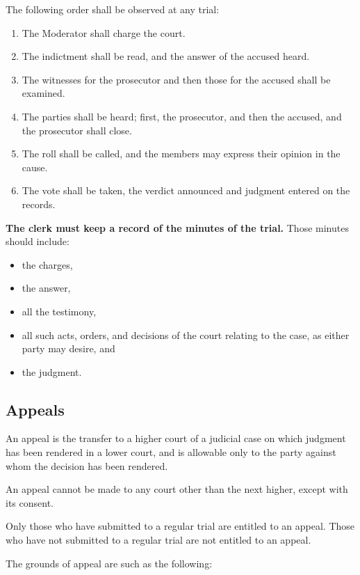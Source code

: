 \documentclass[
]{book}
\providecommand{\tightlist}{%
  \setlength{\itemsep}{0pt}\setlength{\parskip}{0pt}}
\begin{document}
The following order shall be observed at any trial:

\begin{enumerate}
\def\labelenumi{\arabic{enumi}.}
\tightlist
\item
  The Moderator shall charge the court.
\item
  The indictment shall be read, and the answer of the accused heard.
\item
  The witnesses for the prosecutor and then those for the accused shall be examined.
\item
  The parties shall be heard; first, the prosecutor, and then the accused, and the prosecutor shall close.
\item
  The roll shall be called, and the members may express their opinion in the cause.
\item
  The vote shall be taken, the verdict announced and judgment entered on the records.
\end{enumerate}

\textbf{The clerk must keep a record of the minutes of the trial.} Those minutes should include:

\begin{itemize}
\tightlist
\item
  the charges,
\item
  the answer,
\item
  all the testimony,
\item
  all such acts, orders, and decisions of the court relating to the case, as either party may desire, and
\item
  the judgment.
\end{itemize}

\hypertarget{appeals}{%
\subsection{Appeals}\label{appeals}}

An appeal is the transfer to a higher court of a judicial case on which judgment has been rendered in a lower court, and is allowable only to the party against whom the decision has been rendered.

An appeal cannot be made to any court other than the next higher, except with its consent.

Only those who have submitted to a regular trial are entitled to an appeal. Those who have not submitted to a regular trial are not entitled to an appeal.

The grounds of appeal are such as the following:
\end{document}
